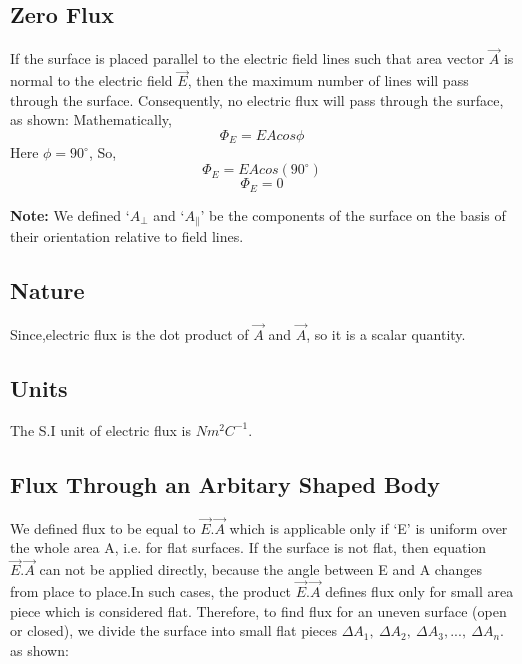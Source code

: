\subsection*{Zero Flux}
If the surface is placed parallel to the electric field lines such that
area vector $\vec{A}$ is normal to the electric field $\vec{E}$,
then the maximum number of lines will pass through the surface. Consequently,
no electric flux will pass through the surface, as shown:
Mathematically,
\begin{equation}
  \Phi_{E} = EAcos\phi \nonumber
\end{equation}
Here $\phi = 90^{\circ}$, So,
\begin{equation}
  \Phi_{E} = EAcos(90^{\circ}) \nonumber
\end{equation}
\begin{equation}
  \Phi_{E} = 0 \nonumber
\end{equation}

\noindent\textbf{Note:} We defined `$A_{\bot}$ and `$A_{\parallel}$' be the components of the surface on the basis of
their orientation relative to field lines.

\subsection*{Nature}
Since,electric flux is the dot product of $\vec{A}$ and $\vec{A}$, so it is a scalar quantity.

\subsection*{Units}
The S.I unit of electric flux is $Nm^{2}C^{-1}$.
\subsection{Flux Through an Arbitary Shaped Body}
We defined flux to be equal to $\vec{E}.\vec{A}$ which is applicable
only if `E' is uniform over the whole area A, i.e. for flat surfaces.
If the surface is not flat, then equation $\vec{E}.\vec{A}$ can not be
applied directly, because the angle between E and A changes from place
to place.In such cases, the product $\vec{E}.\vec{A}$ defines flux only
for small area piece which is considered flat. Therefore, to find flux for
an uneven surface (open or closed), we divide the surface into small flat
pieces $\Delta A_{1},\:\Delta A_{2},\:\Delta A_{3},...,\:\Delta A_{n}$.
as shown:



